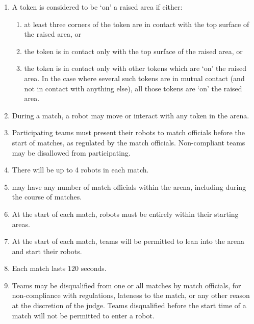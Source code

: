 \begin{enumerate}
\begin{enumerate}
    \end{enumerate}
  \item A token is considered to be `on' a raised area if either:
    \begin{enumerate}
      \item at least three corners of the token are in contact with the top
            surface of the raised area, or
      \item the token is in contact only with the top surface of the raised area, or
      \item the token is in contact only with other tokens which are `on' the raised area.
            In the case where several such tokens are in mutual contact (and not in
            contact with anything else), all those tokens are `on' the raised area.
    \end{enumerate}
  \item During a match, a robot may move or interact with any token in the arena.
  \item Participating teams must present their robots to match officials before
        the start of matches, as regulated by the match officials. Non-compliant
        teams may be disallowed from participating.
  \item There will be up to 4 robots in each match.
  \item \org may have any number of match officials within the arena, including
        during the course of matches.
  \item At the start of each match, robots must be entirely within their
        starting areas.
  \item At the start of each match, teams will be permitted to lean into the
        arena and start their robots.
  \item Each match lasts $120$ seconds.
  \item Teams may be disqualified from one or all matches by match officials,
        for non-compliance with regulations, lateness to the match, or any other
        reason at the discretion of the judge. Teams disqualified before the
        start time of a match will not be permitted to enter a robot.
\end{enumerate}
